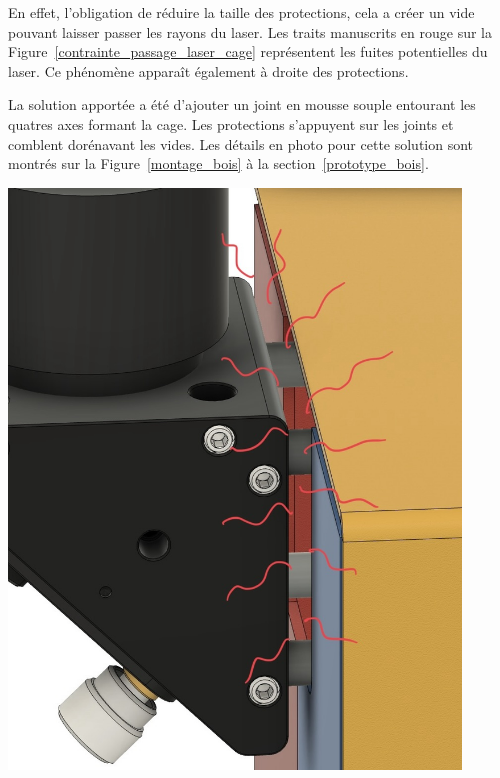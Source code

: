 \begin{minipage}[c]{0.5\textwidth}
    En effet, l'obligation de réduire la taille des protections, cela a créer un vide pouvant laisser passer les rayons du laser. Les traits manuscrits en rouge sur la Figure~\ref{contrainte_passage_laser_cage} représentent les fuites potentielles du laser. Ce phénomène apparaît également à droite des protections.

    La solution apportée a été d'ajouter un joint en mousse souple entourant les quatres axes formant la cage. Les protections s'appuyent sur les joints et comblent dorénavant les vides. Les détails en photo pour cette solution sont montrés sur la Figure~\ref{montage_bois} à la section~\ref{prototype_bois}.
\end{minipage}\hfill
\begin{minipage}[c]{0.48\textwidth}
    \begin{center}
        \includegraphics[width=0.9\textwidth]{assets/figures/Protections_laser/Securite_mecanique/Protection_entree_laser/contrainte_passage_laser_cage.jpeg}
    \end{center}
    \label{contrainte_passage_laser_cage}
\end{minipage}

